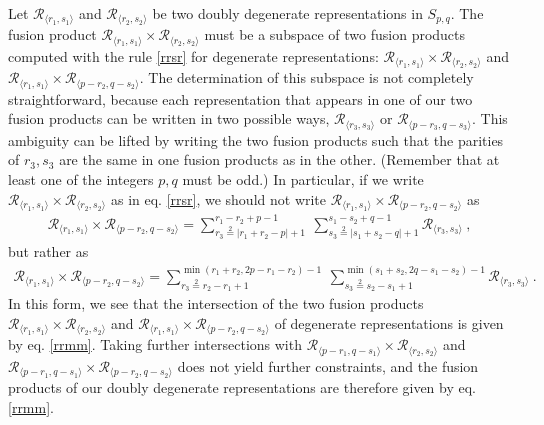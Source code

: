 \documentclass[12pt, a4paper]{article}
\theoremstyle{break}
\begin{document}
Let $\mathcal{R}_{\langle r_1,s_1\rangle}$ and $\mathcal{R}_{\langle r_2,s_2\rangle}$ be two doubly degenerate representations in $S_{p, q}$. The fusion product $\mathcal{R}_{\langle r_1,s_1\rangle}\times \mathcal{R}_{\langle r_2,s_2\rangle}$ must be a subspace of two fusion products computed with the rule \eqref{rrsr} for degenerate representations: $\mathcal{R}_{\langle r_1,s_1\rangle}\times \mathcal{R}_{\langle r_2,s_2\rangle}$ and $\mathcal{R}_{\langle r_1,s_1\rangle}\times \mathcal{R}_{\langle p-r_2,q-s_2\rangle}$. The determination of this subspace is not completely straightforward, because each representation that appears in one of our two fusion products can be written in two possible ways, $\mathcal{R}_{\langle r_3, s_3\rangle}$ or $\mathcal{R}_{\langle p-r_3, q-s_3\rangle}$. 
This ambiguity can be lifted by writing the two fusion products such that the parities of $r_3,s_3$ are the same in one fusion products as in the other. (Remember that at least one of the integers $p,q$ must be odd.)
In particular, if we write $\mathcal{R}_{\langle r_1,s_1\rangle}\times \mathcal{R}_{\langle r_2,s_2\rangle}$ as in eq. \eqref{rrsr}, we should not write $\mathcal{R}_{\langle r_1,s_1\rangle}\times \mathcal{R}_{\langle p-r_2,q-s_2\rangle}$ as 
\begin{align}
 \mathcal{R}_{\langle r_1,s_1\rangle}\times \mathcal{R}_{\langle p-r_2,q-s_2\rangle} 
 = \sum_{r_3\overset{2}{=}|r_1+r_2-p|+1}^{r_1-r_2+p-1}\ \sum_{s_3\overset{2}{=}|s_1+s_2-q|+1}^{s_1-s_2+q-1} \mathcal{R}_{\langle r_3,s_3 \rangle}\ ,
\end{align}
but rather as 
\begin{align}
  \mathcal{R}_{\langle r_1,s_1\rangle}\times \mathcal{R}_{\langle p-r_2,q-s_2\rangle} 
  = \sum_{r_3\overset{2}{=}r_2-r_1+1}^{\min(r_1+r_2,2p-r_1-r_2)-1}\ \sum_{s_3\overset{2}{=}s_2-s_1+1}^{\min(s_1+s_2,2q-s_1-s_2)-1} \mathcal{R}_{\langle r_3,s_3 \rangle}\ .
\end{align}
In this form, we see that the intersection of the two fusion products $\mathcal{R}_{\langle r_1,s_1\rangle}\times \mathcal{R}_{\langle r_2,s_2\rangle}$ and $\mathcal{R}_{\langle r_1,s_1\rangle}\times \mathcal{R}_{\langle p-r_2,q-s_2\rangle}$ of degenerate representations is given by eq. \eqref{rrmm}. Taking further intersections with $\mathcal{R}_{\langle p-r_1,q-s_1\rangle}\times \mathcal{R}_{\langle r_2,s_2\rangle}$ and $\mathcal{R}_{\langle p-r_1,q-s_1\rangle}\times \mathcal{R}_{\langle p-r_2,q-s_2\rangle}$ does not yield further constraints, and the fusion products of our doubly degenerate representations are therefore given by eq. \eqref{rrmm}.
\end{document}

